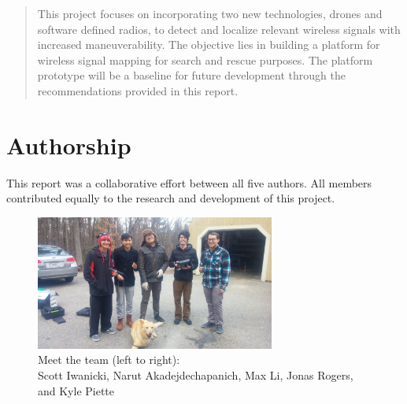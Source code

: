 \documentclass[12pt]{report}
\begin{document}
	\newpage
	
	\doublespacing
	
	\begin{abstract}
		This project focuses on incorporating two new technologies, drones and software defined radios, to detect and localize relevant wireless signals with increased maneuverability. The objective lies in building a platform for wireless signal mapping for search and rescue purposes. The platform prototype will be a baseline for future development through the recommendations provided in this report.
	\end{abstract}
	
	
	
	

	\chapter*{Authorship}
	This report was a collaborative effort between all five authors. All members contributed equally
	to the research and development of this project. \par
	\begin{figure}[hb]
	\centering
	\includegraphics[width=0.70\textwidth]{img/authorship.jpg}
	
	\caption{Meet the team (left to right):\\Scott Iwanicki, Narut Akadejdechapanich, Max Li, Jonas Rogers, and Kyle Piette}
	\label{fig:authorship}
	\end{figure}
	\clearpage
	
\end{document}
